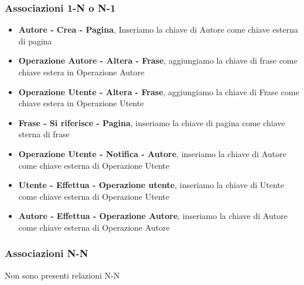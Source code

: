 \subsubsection{Associazioni 1-N o N-1}
\begin{itemize}
    \item{\textbf{Autore - Crea - Pagina}, Inseriamo la chiave di Autore come chiave esterna di pagina}\newline
    \item{\textbf{Operazione Autore - Altera - Frase}, aggiungiamo la chiave di frase come chiave estera in Operazione Autore}\newline
    \item{\textbf{Operazione Utente - Altera - Frase}, aggiungiamo la chiave di Frase come chiave estera in Operazione Utente}\newline
    \item{\textbf{Frase - Si riferisce - Pagina},
    inseriamo la chiave di pagina come chiave sterna di frase}\newline
    \item{\textbf{Operazione Utente - Notifica - Autore}, inseriamo la chiave di Autore come chiave esterna di Operazione Utente}\newline
    \item{\textbf{Utente  - Effettua - Operazione utente}, inseriamo la chiave di Utente come chiave esterna di Operazione Utente}\newline
    \item{\textbf{Autore  - Effettua - Operazione Autore}, inseriamo la chiave di Autore come chiave esterna di Operazione Autore}\newline
\end{itemize}

\subsubsection{Associazioni N-N}
Non sono presenti relazioni N-N